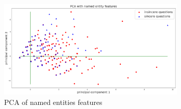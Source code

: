 \documentclass[12pt]{diazessay} %
\begin{document}
\begin{figure}[!htbp]
    \includegraphics[width=0.8\textwidth, center]{graphs/pca/2Dent.png}
    \caption{PCA of named entities features} 
    \label{figure:entpca}
\end{figure}



\clearpage






\newpage
\appendix
\end{document}
